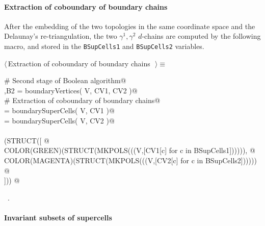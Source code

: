 \documentclass[11pt,oneside]{article}	%
\begin{document}
\paragraph{Extraction of coboundary of boundary chains}

After the embedding of the two topologies in the same coordinate space and the Delaunay's re-triangulation, the two $\gamma^1,\gamma^2$ $d$-chains are computed by the following macro, and stored in the \texttt{BSupCells1} and \texttt{BSupCells2} variables.

\begin{flushleft} \small \label{scrap17}
$\langle\,$Extraction of coboundary of boundary chains\nobreak\ {\footnotesize {}}$\,\rangle\equiv$
\vspace{-1ex}
\begin{list}{}{} \item
\mbox{}\verb@# Second stage of Boolean algorithm@\\
\mbox{},B2 = boundaryVertices( V, CV1, CV2 )@\\
\mbox{}\verb@# Extraction of coboundary of boundary chains@\\
\mbox{} = boundarySuperCells( V, CV1 )@\\
\mbox{} = boundarySuperCells( V, CV2 )@\\
\mbox{}\verb@@\\
\mbox{}\verb@VIEW(STRUCT([ @\\
\mbox{}\verb@   COLOR(GREEN)(STRUCT(MKPOLS(((V,[CV1[c] for c in BSupCells1]))))), @\\
\mbox{}\verb@   COLOR(MAGENTA)(STRUCT(MKPOLS(((V,[CV2[c] for c in BSupCells2]))))) @\\
\mbox{}\verb@])) @\\
\mbox{}\verb@@{\NWsep}
\end{list}
\vspace{-1ex}
\footnotesize\addtolength{\baselineskip}{-1ex}
\begin{list}{}{\setlength{\itemsep}{-\parsep}\setlength{\itemindent}{-\leftmargin}}
\item \NWtxtMacroRefIn\ .
\end{list}
\end{flushleft}

\paragraph{Invariant subsets of supercells}
\end{document}
